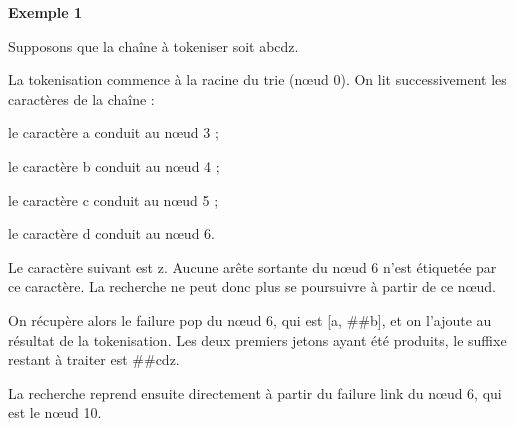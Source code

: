 \documentclass[12pt,a4paper]{report}
\begin{document}
	\textbf{Exemple 1}
	
	Supposons que la chaîne à tokeniser soit abcdz.
	
	La tokenisation commence à la racine du trie (nœud 0). On lit successivement les caractères de la chaîne :
	
	\begin{itemizeFB}
		\item le caractère a conduit au nœud 3 ;
		\item le caractère b conduit au nœud 4 ;
		\item le caractère c conduit au nœud 5 ;
		\item le caractère d conduit au nœud 6.
	\end{itemizeFB}
	
	Le caractère suivant est z. Aucune arête sortante du nœud 6 n'est étiquetée par ce caractère. La recherche ne peut donc plus se poursuivre à partir de ce nœud.
	
	On récupère alors le failure pop du nœud 6, qui est [a, \#\#b], et on l'ajoute au résultat de la tokenisation. Les deux premiers jetons ayant été produits, le suffixe restant à traiter est \#\#cdz.
	
	La recherche reprend ensuite directement à partir du failure link du nœud 6, qui est le nœud 10.
	
\end{document}
